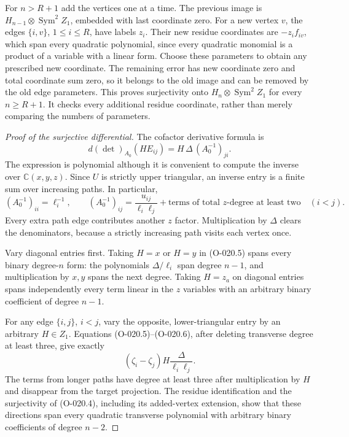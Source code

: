 For $n>R+1$ add the vertices one at a time. The previous
image is $H_{n-1}\otimes\operatorname{Sym}^2Z_1$, embedded
with last coordinate zero. For a new vertex $v$, the
edges $\{i,v\}$, $1\leq i\leq R$, have labels $z_i$.
Their new residue coordinates are $-z_i f_{iv}$, which
span every quadratic polynomial, since every quadratic
monomial is a product of a variable with a linear form.
Choose these parameters to obtain any prescribed new
coordinate. The remaining error has new coordinate zero
and total coordinate sum zero, so it belongs to the old
image and can be removed by the old edge parameters.
This proves surjectivity onto
$H_n\otimes\operatorname{Sym}^2Z_1$ for every $n\geq R+1$.
It checks every additional residue coordinate, rather than
merely comparing the numbers of parameters.

\begin{proof}[Proof of the surjective differential]
The cofactor derivative formula is
\[
             d(\det)_{A_0}(H E_{ij})
                         =H\,\Delta\,(A_0^{-1})_{ji}.
                                                               \tag{O-020.5}
\]
The expression is polynomial although it is convenient to
compute the inverse over $\mathbb C(x,y,z)$.
Since $U$ is strictly upper triangular, an inverse entry
is a finite sum over increasing paths. In particular,
\[
 (A_0^{-1})_{ii}=\ell_i^{-1},\qquad
 (A_0^{-1})_{ij}
       =\frac{u_{ij}}{\ell_i\ell_j}
                    +\text{terms of total $z$-degree at least two}
                       \quad(i<j).                    \tag{O-020.6}
\]
Every extra path edge contributes another $z$ factor.
Multiplication by $\Delta$ clears the denominators,
because a strictly increasing path visits each vertex once.

Vary diagonal entries first. Taking $H=x$ or $H=y$
in (O-020.5) spans every binary degree-$n$ form:
the polynomials $\Delta/\ell_i$ span degree $n-1$,
and multiplication by $x,y$ spans the next degree.
Taking $H=z_a$ on diagonal entries spans independently
every term linear in the $z$ variables with an arbitrary
binary coefficient of degree $n-1$.

For any edge $\{i,j\}$, $i<j$, vary the opposite,
lower-triangular entry by an arbitrary $H\in Z_1$.
Equations (O-020.5)--(O-020.6), after deleting transverse
degree at least three, give exactly
\[
                  (\zeta_i-\zeta_j)H
                          \frac{\Delta}{\ell_i\ell_j}.
                                                               \tag{O-020.7}
\]
The terms from longer paths have degree at least three
after multiplication by $H$ and disappear from the
target projection. The residue identification and the
surjectivity of (O-020.4), including its added-vertex
extension, show that these directions span every quadratic
transverse polynomial with arbitrary binary coefficients
of degree $n-2$.


\end{proof}
